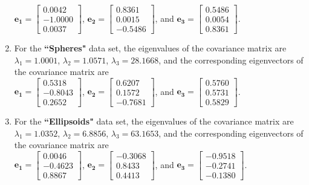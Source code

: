\documentclass[a4paper]{article}
\begin{document}
\begin{spacing}{2.0}
\begin{enumerate}[-]
	 $\mathbf{e_1} = \left[\begin{matrix} 0.0042 \\ -1.0000 \\ 0.0037\end{matrix}\right]$, 
	 $\mathbf{e_2} = \left[\begin{matrix} 0.8361 \\ 0.0015 \\ -0.5486\end{matrix}\right]$, 
	 and $\mathbf{e_3} = \left[\begin{matrix} 0.5486 \\ 0.0054 \\ 0.8361\end{matrix}\right]$.\\
	 
	\item
	For the \textbf{``Spheres"} data set, the eigenvalues of the covariance matrix are $\lambda_1 = 1.0001$, $\lambda_2 = 1.0571$, $\lambda_3 = 	28.1668$, and the corresponding eigenvectors of the covariance matrix are\\
	
	$\mathbf{e_1} = \left[\begin{matrix} 0.5318 \\ -0.8043 \\  0.2652\end{matrix}\right]$, 
	$\mathbf{e_2} = \left[\begin{matrix} 0.6207 \\ 0.1572 \\ -0.7681\end{matrix}\right]$, 
	and $\mathbf{e_3} = \left[\begin{matrix} 0.5760 \\ 0.5731 \\ 0.5829\end{matrix}\right]$.\\
	
	\item
	For the \textbf{``Ellipsoids"} data set, the eigenvalues of the covariance matrix are $\lambda_1 = 1.0352$, $\lambda_2 = 6.8856$, $\lambda_3 = 	6
	3.1653$, and the corresponding eigenvectors of the covariance matrix are\\ 
	
	$\mathbf{e_1} = \left[\begin{matrix} 0.0046\\ -0.4623\\ 0.8867\end{matrix}\right]$,
	$\mathbf{e_2} = \left[\begin{matrix} -0.3068\\ 0.8433\\ 0.4413\end{matrix}\right]$, 
	and $\mathbf{e_3} = \left[\begin{matrix} -0.9518\\ -0.2741\\ -0.1380\end{matrix}\right]$.\\
	\end{enumerate}
	

\end{spacing}
\end{document}
